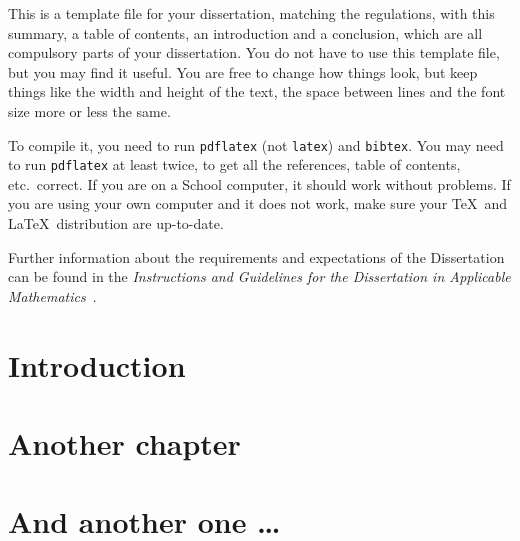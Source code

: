 \documentclass[a4paper,oneside,11pt]{report}
\begin{document}

\dissertationtitlepage


\begin{dissertationsummary}
  This is a template file for your dissertation, matching the regulations,
  with this summary, a table of contents, an introduction and a conclusion,
  which are all compulsory parts of your dissertation. You do not have to
  use this template file, but you may find it useful. You are free to
  change how things look, but keep things like the width and height of the
  text, the space between lines and the font size more or less the same.

  To compile it, you need to run \texttt{pdflatex} (not \texttt{latex}) and
  \texttt{bibtex}. You may need to run \texttt{pdflatex} at least twice, to
  get all the references, table of contents, etc.\ correct. If you are on
  a School computer, it should work without problems. If you are using your
  own computer and it does not work, make sure your \TeX\ and \LaTeX\
  distribution are up-to-date.

  Further information about the requirements and expectations of the
  Dissertation can be found in the \textit{Instructions and Guidelines for
    the Dissertation in Applicable Mathematics}~\cite{IandG1718}.
\end{dissertationsummary}


\dissertationtableofcontents


\chapter{Introduction}

\chapter{Another chapter}

\chapter{And another one \ldots}
\end{document}
